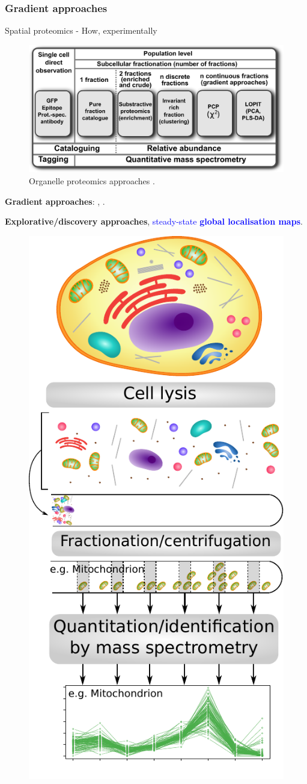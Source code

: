 \subsubsection*{Gradient approaches}
\label{sec:grad}

\begin{frame}{Spatial proteomics - How, experimentally}
  \begin{figure}
    \includegraphics[width=.8\linewidth]{figs_all/F02-expdesigns.pdf}
    \caption{Organelle proteomics approaches
      \citep{Gatto:2010}.}
  \end{figure}

  \textbf{Gradient approaches}: \cite{Dunkley:2006},
  \cite{Foster2006}.

  \bigskip

  \textbf{Explorative/discovery approaches},
  \textcolor{Blue}{steady-state \textbf{global localisation maps}}.
\end{frame}


\begin{frame}{}
  \begin{figure}
    \includegraphics[width=.39\linewidth]{figs_all/workflow_primary.pdf}
  \end{figure}
\end{frame}


